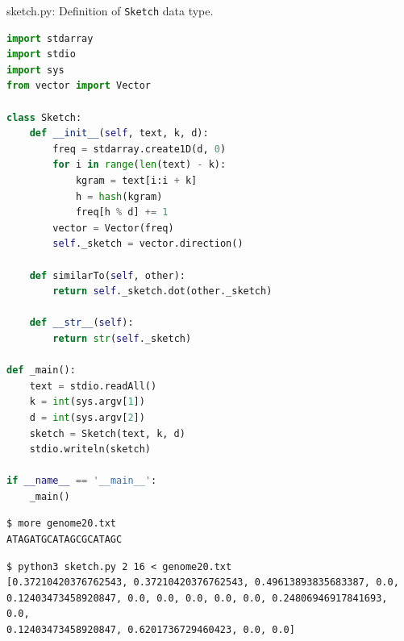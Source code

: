 \documentclass[8pt,a4paper,compress]{beamer}
\begin{document}
\begin{frame}[fragile]
\pause

\begin{framed}
\tiny sketch.py: Definition of \lstinline{Sketch} data type. 
\end{framed}

\begin{lstlisting}[language=Python,style=focusin]
import stdarray
import stdio
import sys
from vector import Vector

class Sketch:
    def __init__(self, text, k, d):
        freq = stdarray.create1D(d, 0)
        for i in range(len(text) - k):
            kgram = text[i:i + k]
            h = hash(kgram)
            freq[h % d] += 1
        vector = Vector(freq)
        self._sketch = vector.direction()

    def similarTo(self, other):
        return self._sketch.dot(other._sketch)

    def __str__(self):
        return str(self._sketch)

def _main():
    text = stdio.readAll()
    k = int(sys.argv[1])
    d = int(sys.argv[2])
    sketch = Sketch(text, k, d)
    stdio.writeln(sketch)

if __name__ == '__main__':
    _main()
\end{lstlisting}
\end{frame}

\begin{frame}[fragile]
\pause

\begin{lstlisting}[language={},style=focusin]
$ more genome20.txt
ATAGATGCATAGCGCATAGC
\end{lstlisting}

\pause
\bigskip

\begin{lstlisting}[language={},style=focusin]
$ python3 sketch.py 2 16 < genome20.txt 
[0.37210420376762543, 0.37210420376762543, 0.49613893835683387, 0.0, 
0.12403473458920847, 0.0, 0.0, 0.0, 0.0, 0.0, 0.24806946917841693, 0.0, 
0.12403473458920847, 0.6201736729460423, 0.0, 0.0]
\end{lstlisting}
\end{frame}
\end{document}
